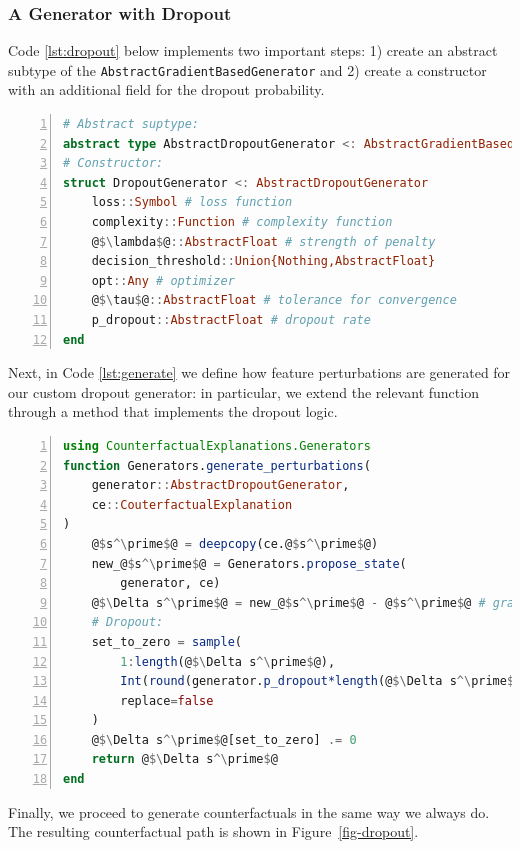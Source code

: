 \documentclass[
  letterpaper,
  DIV=11,
  numbers=noendperiod]{scrartcl}
\begin{document}
\hypertarget{a-generator-with-dropout}{%
\subsubsection{A Generator with
Dropout}\label{a-generator-with-dropout}}

Code \ref{lst:dropout} below implements two important steps: 1) create
an abstract subtype of the \texttt{AbstractGradientBasedGenerator} and
2) create a constructor with an additional field for the dropout
probability.

\begin{lstlisting}[language=Julia, escapechar=@, numbers=left, label={lst:dropout}, caption={Building a custom generator with dropout.}]
# Abstract suptype:
abstract type AbstractDropoutGenerator <: AbstractGradientBasedGenerator end
# Constructor:
struct DropoutGenerator <: AbstractDropoutGenerator
    loss::Symbol # loss function
    complexity::Function # complexity function
    @$\lambda$@::AbstractFloat # strength of penalty
    decision_threshold::Union{Nothing,AbstractFloat} 
    opt::Any # optimizer
    @$\tau$@::AbstractFloat # tolerance for convergence
    p_dropout::AbstractFloat # dropout rate
end
\end{lstlisting}

Next, in Code \ref{lst:generate} we define how feature perturbations are
generated for our custom dropout generator: in particular, we extend the
relevant function through a method that implements the dropout logic.

\begin{lstlisting}[language=Julia, escapechar=@, numbers=left, label={lst:generate}, caption={Generating feature perturbations with dropout.}]
using CounterfactualExplanations.Generators
function Generators.generate_perturbations(
    generator::AbstractDropoutGenerator, 
    ce::CouterfactualExplanation
)
    @$s^\prime$@ = deepcopy(ce.@$s^\prime$@)
    new_@$s^\prime$@ = Generators.propose_state(
        generator, ce)
    @$\Delta s^\prime$@ = new_@$s^\prime$@ - @$s^\prime$@ # gradient step
    # Dropout:
    set_to_zero = sample(
        1:length(@$\Delta s^\prime$@),
        Int(round(generator.p_dropout*length(@$\Delta s^\prime$@))),
        replace=false
    )
    @$\Delta s^\prime$@[set_to_zero] .= 0
    return @$\Delta s^\prime$@
end
\end{lstlisting}

Finally, we proceed to generate counterfactuals in the same way we
always do. The resulting counterfactual path is shown in
Figure~\ref{fig-dropout}.
\end{document}
